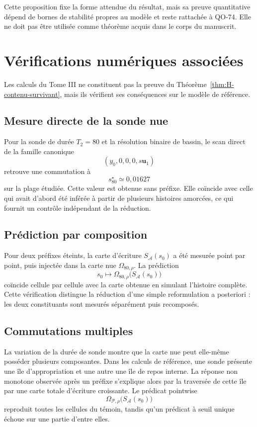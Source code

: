 Cette proposition fixe la forme attendue du résultat, mais sa preuve
quantitative dépend de bornes de stabilité propres au modèle et reste
rattachée à QO-74. Elle ne doit pas être utilisée comme théorème acquis
dans le corps du manuscrit.

\section{Vérifications numériques associées}
\label{annexe-H-verifications}

Les calculs du Tome III ne constituent pas la preuve du Théorème~\ref{thm:H-contenu-survivant},
mais ils vérifient ses conséquences sur le modèle de référence.

\subsection{Mesure directe de la sonde nue}
\label{annexe-H-verification-omega}

Pour la sonde de durée $T_2=80$ et la résolution binaire de bassin, le
scan direct de la famille canonique
\[
(y_0,0,0,0,s\mathbf u_1)
\]
retrouve une commutation à
\[
s_{80}^{\star}\simeq0{,}01627
\]
sur la plage étudiée. Cette valeur est obtenue sans préfixe. Elle
coïncide avec celle qui avait d'abord été inférée à partir de plusieurs
histoires amorcées, ce qui fournit un contrôle indépendant de la
réduction.

\subsection{Prédiction par composition}
\label{annexe-H-verification-prediction}

Pour deux préfixes éteints, la carte d'écriture
$S_{\mathcal A}(s_0)$ a été mesurée point par point, puis injectée dans
la carte nue $\Omega_{80,\rho}$. La prédiction
\[
s_0
\longmapsto
\Omega_{80,\rho}
\bigl(S_{\mathcal A}(s_0)\bigr)
\]
coïncide cellule par cellule avec la carte obtenue en simulant
l'histoire complète. Cette vérification distingue la réduction d'une
simple reformulation a posteriori : les deux constituants sont mesurés
séparément puis recomposés.

\subsection{Commutations multiples}
\label{annexe-H-verification-iles}

La variation de la durée de sonde montre que la carte nue peut elle-même
posséder plusieurs composantes. Dans les calculs de référence, une sonde
présente une île d'appropriation et une autre une île de repos interne.
La réponse non monotone observée après un préfixe s'explique alors par la
traversée de cette île par une carte totale d'écriture croissante. Le
prédicat pointwise
\[
\Omega_{\mathcal P,\rho}
\bigl(S_{\mathcal A}(s_0)\bigr)
\]
reproduit toutes les cellules du témoin, tandis qu'un prédicat à seuil
unique échoue sur une partie d'entre elles.

